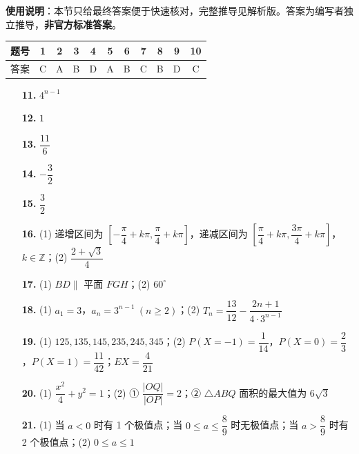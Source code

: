 
\begin{gknotice}
\textbf{使用说明}：本节只给最终答案便于快速核对，完整推导见解析版。答案为编写者独立推导，\textbf{非官方标准答案}。
\end{gknotice}

\begin{center}\begin{tabular}{ccccccccccc}
\toprule
题号 & 1 & 2 & 3 & 4 & 5 & 6 & 7 & 8 & 9 & 10 \\
\midrule
答案 & C & A & B & D & A & B & C & B & D & C \\
\bottomrule
\end{tabular}\end{center}

\begin{itemize}[leftmargin=2.6em]
  \item[\textbf{11.}] $4^{n-1}$
  \item[\textbf{12.}] $1$
  \item[\textbf{13.}] $\dfrac{11}{6}$
  \item[\textbf{14.}] $-\dfrac{3}{2}$
  \item[\textbf{15.}] $\dfrac{3}{2}$
\end{itemize}

\begin{itemize}[leftmargin=2.6em]
  \item[\textbf{16.}] (1) 递增区间为 $[-\dfrac{\pi}{4}+k\pi,\dfrac{\pi}{4}+k\pi]$，递减区间为 $[\dfrac{\pi}{4}+k\pi,\dfrac{3\pi}{4}+k\pi]$，$k\in\mathbb{Z}$；(2) $\dfrac{2+\sqrt{3}}{4}$
  \item[\textbf{17.}] (1) $BD\parallel$ 平面 $FGH$；(2) $60^\circ$
  \item[\textbf{18.}] (1) $a_1=3$，$a_n=3^{n-1}\ (n\ge2)$；(2) $T_n=\dfrac{13}{12}-\dfrac{2n+1}{4\cdot3^{n-1}}$
  \item[\textbf{19.}] (1) $125,135,145,235,245,345$；(2) $P(X=-1)=\dfrac{1}{14}$，$P(X=0)=\dfrac{2}{3}$，$P(X=1)=\dfrac{11}{42}$；$EX=\dfrac{4}{21}$
  \item[\textbf{20.}] (1) $\dfrac{x^2}{4}+y^2=1$；(2) ① $\dfrac{|OQ|}{|OP|}=2$；② $\triangle ABQ$ 面积的最大值为 $6\sqrt{3}$
  \item[\textbf{21.}] (1) 当 $a<0$ 时有 1 个极值点；当 $0\le a\le\dfrac{8}{9}$ 时无极值点；当 $a>\dfrac{8}{9}$ 时有 2 个极值点；(2) $0\le a\le1$
\end{itemize}
